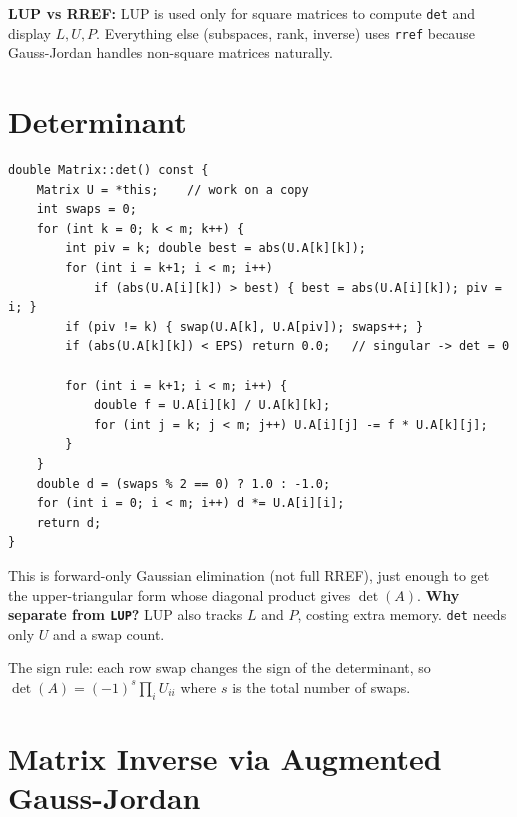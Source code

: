 \documentclass[12pt, a4paper]{article}
\newcommand{\fn}[1]{\texttt{\small\color{funcgreen}#1}}
\begin{document}
\noindent
\textbf{LUP vs RREF:}  LUP is used only for square matrices to compute
\fn{det} and display $L, U, P$.  Everything else (subspaces, rank, inverse)
uses \fn{rref} because Gauss-Jordan handles non-square matrices naturally.

\section{Determinant}

\begin{lstlisting}
double Matrix::det() const {
    Matrix U = *this;    // work on a copy
    int swaps = 0;
    for (int k = 0; k < m; k++) {
        int piv = k; double best = abs(U.A[k][k]);
        for (int i = k+1; i < m; i++)
            if (abs(U.A[i][k]) > best) { best = abs(U.A[i][k]); piv = i; }
        if (piv != k) { swap(U.A[k], U.A[piv]); swaps++; }
        if (abs(U.A[k][k]) < EPS) return 0.0;   // singular -> det = 0

        for (int i = k+1; i < m; i++) {
            double f = U.A[i][k] / U.A[k][k];
            for (int j = k; j < m; j++) U.A[i][j] -= f * U.A[k][j];
        }
    }
    double d = (swaps % 2 == 0) ? 1.0 : -1.0;
    for (int i = 0; i < m; i++) d *= U.A[i][i];
    return d;
}
\end{lstlisting}

This is forward-only Gaussian elimination (not full RREF), just enough to get
the upper-triangular form whose diagonal product gives $\det(A)$.
\textbf{Why separate from \fn{LUP}?}  LUP also tracks $L$ and $P$, costing
extra memory.  \fn{det} needs only $U$ and a swap count.

The sign rule: each row swap changes the sign of the determinant, so
$\det(A) = (-1)^s \prod_i U_{ii}$ where $s$ is the total number of swaps.

\section{Matrix Inverse via Augmented Gauss-Jordan}
\end{document}
